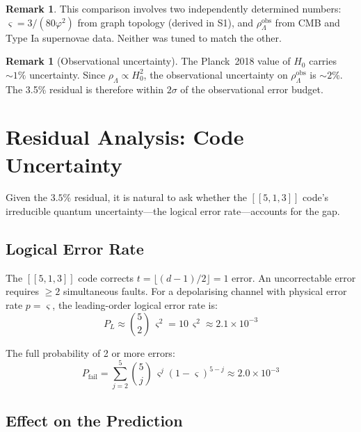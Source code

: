 \documentclass[11pt,a4paper]{article}
\theoremstyle{definition}
\newtheorem{remark}[theorem]{Remark}
\newcommand{\gs}{\varsigma}                %
\newcommand{\rhoL}{\rho_{\Lambda}}
\begin{document}
\begin{remark}\label{rem:independent}
This comparison involves two independently determined numbers: $\gs = 3/(80\varphi^2)$ from graph topology (derived in S1), and $\rhoL^{\text{obs}}$ from CMB and Type Ia supernovae data. Neither was tuned to match the other.
\end{remark}

\begin{remark}[Observational uncertainty]\label{rem:obs-uncertainty}
The Planck~2018 value of $H_0$ carries $\sim\!1\%$ uncertainty. Since $\rhoL \propto H_0^2$, the observational uncertainty on $\rhoL^{\text{obs}}$ is $\sim\!2\%$. The 3.5\% residual is therefore within $2\sigma$ of the observational error budget.
\end{remark}


\section{Residual Analysis: Code Uncertainty}

Given the $3.5\%$ residual, it is natural to ask whether the $[[5,1,3]]$ code's irreducible quantum uncertainty---the logical error rate---accounts for the gap.

\subsection{Logical Error Rate}

The $[[5,1,3]]$ code corrects $t = \lfloor(d-1)/2\rfloor = 1$ error. An uncorrectable error requires $\geq 2$ simultaneous faults. For a depolarising channel with physical error rate $p = \gs$, the leading-order logical error rate is:
\begin{equation}
    P_L \approx \binom{5}{2}\,\gs^2 = 10\,\gs^2 \approx 2.1 \times 10^{-3}
\end{equation}

The full probability of 2 or more errors:
\begin{equation}
    P_{\text{fail}} = \sum_{j=2}^{5} \binom{5}{j}\,\gs^j(1-\gs)^{5-j} \approx 2.0 \times 10^{-3}
\end{equation}

\subsection{Effect on the Prediction}
\end{document}
